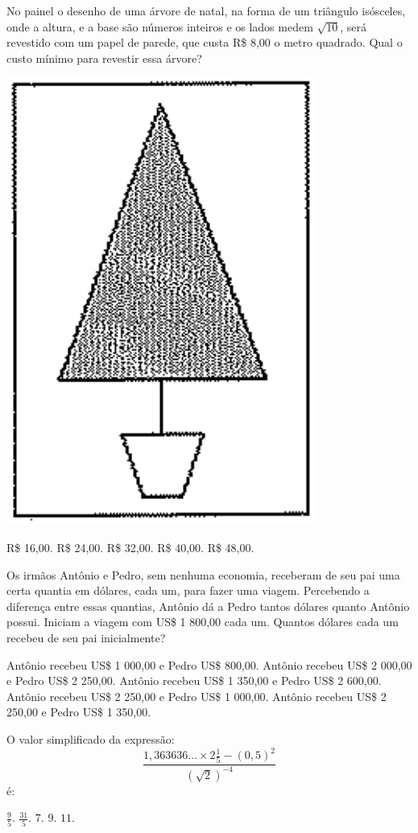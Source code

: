 \begin{question}%
No painel o desenho de uma árvore de natal, na forma de um triângulo isósceles, onde a altura, e a base são números inteiros e os lados medem \(\sqrt{10}\), será revestido com um papel de parede, que custa R\$ 8,00 o metro quadrado. Qual o custo mínimo para revestir essa árvore?

    \centering
    \includegraphics[width=.2\textwidth]{CONCURSO/EAM/IMAGES/2004/EAM200406IMG.png}

    \begin{tasks}
        \task R\$ 16,00.
        \task R\$ 24,00.
        \task R\$ 32,00.
        \task R\$ 40,00.
        \task R\$ 48,00.
    \end{tasks}
\end{question}

\begin{question}%
Os irmãos Antônio e Pedro, sem nenhuma economia, receberam de seu pai uma certa quantia em dólares, cada um, para fazer uma viagem. Percebendo a diferença entre essas quantias, Antônio dá a Pedro tantos dólares quanto Antônio possui. Iniciam a viagem com US\$ 1 800,00 cada um. Quantos dólares cada um recebeu de seu pai inicialmente?
    \begin{tasks}
        \task Antônio recebeu US\$ 1 000,00 e Pedro US\$ 800,00.
        \task Antônio recebeu US\$ 2 000,00 e Pedro US\$ 2 250,00.
        \task Antônio recebeu US\$ 1 350,00 e Pedro US\$ 2 600,00.
        \task Antônio recebeu US\$ 2 250,00 e Pedro US\$ 1 000,00.
        \task Antônio recebeu US\$ 2 250,00 e Pedro US\$ 1 350,00.
    \end{tasks}
\end{question}

\begin{question}%
O valor simplificado da expressão:
\[ \frac{1,363636 \ldots \times 2 \frac{1}{5} - (0,5)^2}{(\sqrt{2})^{-4}}\] é:
    \begin{tasks}
        \task \(\frac{9}{5}\).
        \task \(\frac{31}{5}\).
        \task \(7\).
        \task \(9\).
        \task \(11\).
    \end{tasks}
\end{question}

